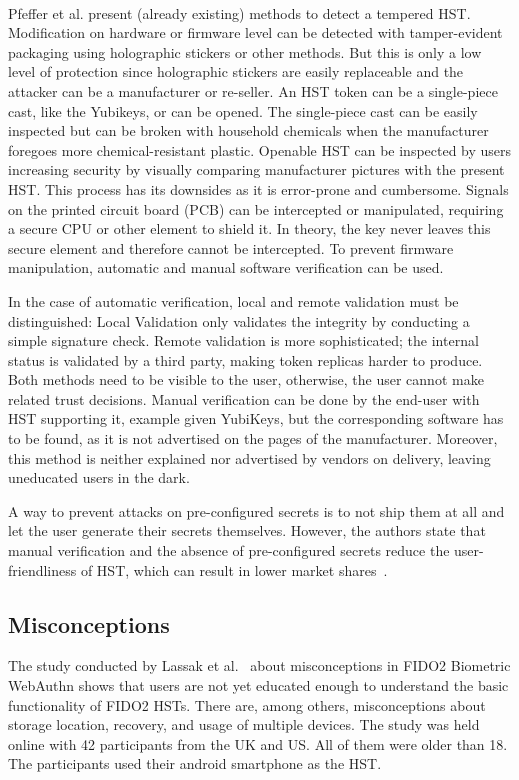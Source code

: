 \documentclass[runningheads]{llncs}
\begin{document}
\paragraph{}
Pfeffer et al. present (already existing) methods to detect a tempered HST.
Modification on hardware or firmware level can be detected with tamper-evident packaging using holographic stickers or other methods. But this is only a low level of protection since holographic stickers are easily replaceable and the attacker can be a manufacturer or re-seller. An HST token can be a single-piece cast, like the Yubikeys, or can be opened. The single-piece cast can be easily inspected but can be broken with household chemicals when the manufacturer foregoes more chemical-resistant plastic. Openable HST can be inspected by users increasing security by visually comparing manufacturer pictures with the present HST. This process has its downsides as it is error-prone and cumbersome. Signals on the printed circuit board (PCB) can be intercepted or manipulated, requiring a secure CPU or other element to shield it. In theory, the key never leaves this secure element and therefore cannot be intercepted. To prevent firmware manipulation, automatic and manual software verification can be used. 

In the case of automatic verification, local and remote validation must be distinguished: Local Validation only validates the integrity by conducting a simple signature check. Remote validation is more sophisticated; the internal status is validated by a third party, making token replicas harder to produce. Both methods need to be visible to the user, otherwise, the user cannot make related trust decisions.
Manual verification can be done by the end-user with HST supporting it, example given YubiKeys, but the corresponding software has to be found, as it is not advertised on the pages of the manufacturer. Moreover, this method is neither explained nor advertised by vendors on delivery, leaving uneducated users in the dark.

A way to prevent attacks on pre-configured secrets is to not ship them at all and let the user generate their secrets themselves. However, the authors state that manual verification and the absence of pre-configured secrets reduce the user-friendliness of HST, which can result in lower market shares~\cite{272198}.

\subsection{Misconceptions}
The study conducted by Lassak et al.~\cite{274547} about misconceptions in FIDO2 Biometric WebAuthn shows that users are not yet educated enough to understand the basic functionality of FIDO2 HSTs. There are, among others, misconceptions about storage location, recovery, and usage of multiple devices. The study was held online with 42 participants from the UK and US. All of them were older than 18. The participants used their android smartphone as the HST.
\end{document}

